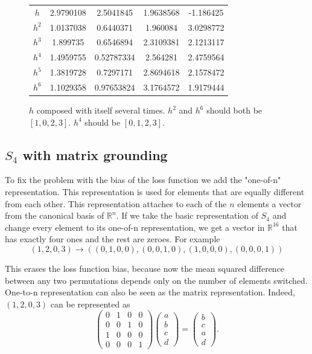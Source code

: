 \begin{figure}
\center
\caption{$h$ composed with itself several times. $h^2$ and $h^6$ should both be $[1,0,2,3]$. $h^4$ should be $[0,1,2,3]$.}
\label{table:s4_half_basic_gen}
\begin{tabular}{c|cccc}
$h$   & 2.9790108 & 2.5041845 & 1.9638568 & -1.186425\\
$h^2$ & 1.0137038 & 0.6440371 & 1.960084 & 3.0298772\\
$h^3$ & 1.899735 & 0.6546894 & 2.3109381 & 2.1213117\\
$h^4$ & 1.4959755 & 0.52787334 & 2.564281 & 2.4759564\\
$h^5$ & 1.3819728 & 0.7297171 & 2.8694618 & 2.1578472\\
$h^6$ & 1.1029358 & 0.97653824 & 3.1764572 & 1.9179444\\

\end{tabular}
\end{figure}

\subsection{$S_4$ with matrix grounding}
To fix the problem with the bias of the loss function we add the "one-of-n" representation. This representation is used for elements that are equally different from each other. This representation attaches to each of the $n$ elements a vector from the canonical basis of $\mathbb{R}^n$. If we take the basic representation of $S_4$ and change every element to its one-of-n representation, we get a vector in $\mathbb{R}^{16}$ that has exactly four ones and the rest are zeroes. For example 
$$(1,2,0,3)\rightarrow \left((0,1,0,0),(0,0,1,0),(1,0,0,0),(0,0,0,1)\right)$$

This erases the loss function bias, because now the mean squared difference between any two permutations depends only on the number of elements switched. One-to-n representation can also be seen as the matrix representation. Indeed, $(1,2,0,3)$ can be represented as
$$
\left(
\begin{matrix}
0 & 1 & 0 & 0\\
0 & 0 & 1 & 0\\
1 & 0 & 0 & 0\\
0 & 0 & 0 & 1
\end{matrix}
\right)
\left(
\begin{matrix}
a\\
b\\
c\\
d
\end{matrix}
\right)
=
\left(
\begin{matrix}
b\\
c\\
a\\
d
\end{matrix}
\right).
$$

